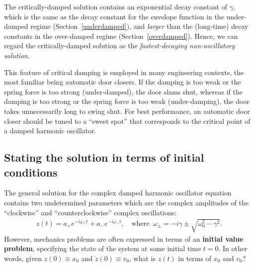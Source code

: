 \documentclass[10pt,a4paper]{article}
\begin{document}
The critically-damped solution contains an exponential decay constant
of $\gamma$, which is the same as the decay constant for the envelope
function in the under-damped regime (Section~\ref{underdamped}), and
\textit{larger} than the (long-time) decay constants in the
over-damped regime (Section~\ref{overdamped}).  Hence, we can regard
the critically-damped solution as the \textit{fastest-decaying
  non-oscillatory solution}.

This feature of critical damping is employed in many engineering
contexts, the most familiar being automatic door closers. If the
damping is too weak or the spring force is too strong (under-damped),
the door slams shut, whereas if the damping is too strong or the
spring force is too weak (under-damping), the door takes unnecessarily
long to swing shut. For best performance, an automatic door closer
should be tuned to a ``sweet spot'' that corresponds to the critical
point of a damped harmonic oscillator.

\subsection{Stating the solution in terms of initial conditions}
\label{stating-the-solution-in-terms-of-initial-conditions}

The general solution for the complex damped harmonic oscillator
equation contains two undetermined parameters which are the complex
amplitudes of the ``clockwise'' and ``counterclockwise'' complex
oscillations:
\begin{align}
  z(t) = a_+ e^{-i\omega_+ t} + a_- e^{-i\omega_- t}, \quad\mathrm{where} \;\; \omega_\pm =  -i\gamma  \pm \sqrt{\omega_0^2 - \gamma^2}.
\end{align}
However, mechanics problems are often expressed in terms of an
\textbf{initial value problem}, specifying the state of the system at
some initial time $t = 0$. In other words, given $z(0) \equiv x_0$ and
$\dot{z}(0) \equiv v_0$, what is $z(t)$ in terms of $x_0$ and $v_0$?
\end{document}
